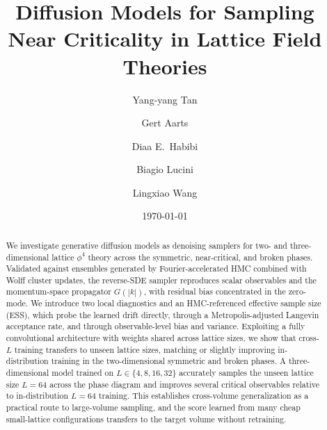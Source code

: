\documentclass[reprint,twocolumn,superscriptaddress,preprintnumbers,amsmath,amssymb,aps,prd,floatfix]{revtex4-2}
\newcommand{\gettitle}{Diffusion Models for Sampling Near Criticality in Lattice Field Theories}
\begin{document}
\title{\gettitle}
\author{Yang-yang Tan}

\author{Gert Aarts}

\author{Diaa E.~Habibi}

\author{Biagio Lucini}

\author{Lingxiao Wang}

\date{\today}

\begin{abstract}
We investigate generative diffusion models as denoising samplers for two- and three-dimensional lattice $\phi^4$ theory across the symmetric, near-critical, and broken phases. Validated against ensembles generated by Fourier-accelerated HMC combined with Wolff cluster updates, the reverse-SDE sampler reproduces scalar observables and the momentum-space propagator $G(|k|)$, with residual bias concentrated in the zero-mode. We introduce two local diagnostics and an HMC-referenced effective sample size (ESS), which probe the learned drift directly, through a Metropolis-adjusted Langevin acceptance rate, and through observable-level bias and variance. Exploiting a fully convolutional architecture with weights shared across lattice sizes, we show that cross-$L$ training transfers to unseen lattice sizes, matching or slightly improving in-distribution training in the two-dimensional symmetric and broken phases. A three-dimensional model trained on $L \in \{4, 8, 16, 32\}$ accurately samples the unseen lattice size $L = 64$ across the phase diagram and improves several critical observables relative to in-distribution $L = 64$ training. This establishes cross-volume generalization as a practical route to large-volume sampling, and the score learned from many cheap small-lattice configurations transfers to the target volume without retraining.
\end{abstract}
\end{document}
